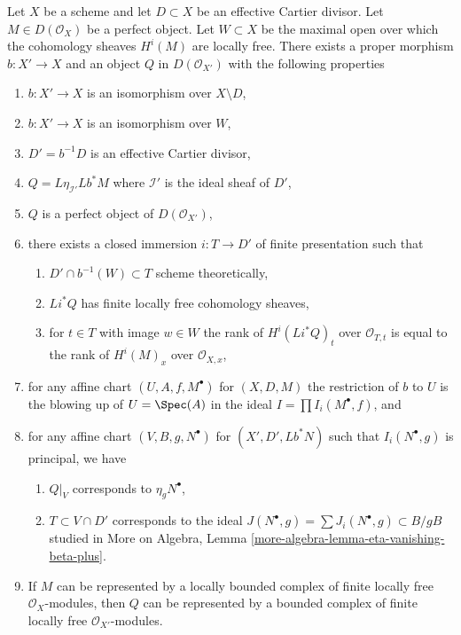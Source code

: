 \begin{lemma}
\label{lemma-complex-and-divisor-derived}
Let $X$ be a scheme and let $D \subset X$ be an effective Cartier divisor. Let
$M \in D(\mathcal{O}_X)$ be a perfect object. Let $W \subset X$ be the maximal
open over which the cohomology sheaves $H^i(M)$ are locally free.
There exists a proper morphism $b : X' \longrightarrow X$
and an object $Q$ in $D(\mathcal{O}_{X'})$ with the following properties
\begin{enumerate}
\item $b : X' \to X$ is an isomorphism over $X \setminus D$,
\item $b : X' \to X$ is an isomorphism over $W$,
\item $D' = b^{-1}D$ is an effective Cartier divisor,
\item $Q = L\eta_{\mathcal{I}'}Lb^*M$ where $\mathcal{I}'$
is the ideal sheaf of $D'$,
\item $Q$ is a perfect object of $D(\mathcal{O}_{X'})$,
\item there exists a closed immersion $i : T \to D'$ of finite presentation
such that
\begin{enumerate}
\item $D' \cap b^{-1}(W) \subset T$ scheme theoretically,
\item $Li^*Q$ has finite locally free cohomology sheaves,
\item for $t \in T$ with image $w \in W$ the rank
of $H^i(Li^*Q)_t$ over $\mathcal{O}_{T, t}$ is equal to the
rank of $H^i(M)_x$ over $\mathcal{O}_{X, x}$,
\end{enumerate}
\item for any affine chart $(U, A, f, M^\bullet)$ for $(X, D, M)$
the restriction of $b$ to $U$ is the blowing up of $U = \Spec(A)$
in the ideal $I = \prod I_i(M^\bullet, f)$, and
\item for any affine chart $(V, B, g, N^\bullet)$ for $(X', D', Lb^*N)$
such that $I_i(N^\bullet, g)$ is principal, we have
\begin{enumerate}
\item $Q|_V$ corresponds to $\eta_gN^\bullet$,
\item $T \subset V \cap D'$ corresponds to the ideal
$J(N^\bullet, g) = \sum J_i(N^\bullet, g) \subset B/gB$
studied in
More on Algebra, Lemma \ref{more-algebra-lemma-eta-vanishing-beta-plus}.
\end{enumerate}
\item If $M$ can be represented by a locally bounded complex
of finite locally free $\mathcal{O}_X$-modules, then $Q$ can
be represented by a bounded complex of finite locally free
$\mathcal{O}_{X'}$-modules.
\end{enumerate}
\end{lemma}

